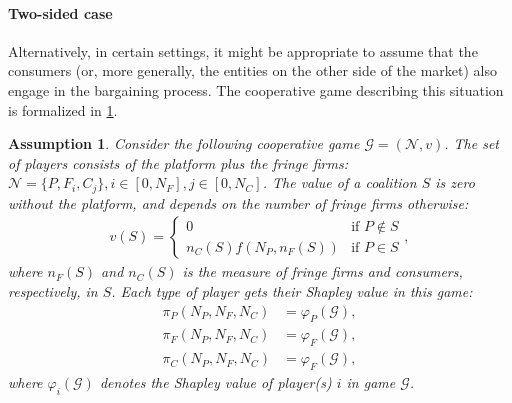 \documentclass[a4paper]{article}
\newtheorem{assumption}{Assumption}
\begin{document}
\paragraph{Two-sided case} Alternatively, in certain settings, it might be appropriate to assume that the consumers (or, more generally, the entities on the other side of the market) also engage in the bargaining process.
The cooperative game describing this situation is formalized in \cref{ass:profit_sharing_two_sided}.
\begin{assumption}
    \label{ass:profit_sharing_two_sided}
    Consider the following cooperative game $\mathcal{G} = (\mathcal{N}, v)$.
    The set of players consists of the platform plus the fringe firms: $\mathcal{N} = \{P, F_i, C_j\}, i \in [0, N_F], j \in [0, N_C]$.
    The value of a coalition $S$ is zero without the platform, and depends on the number of fringe firms otherwise:
    \begin{align*}
        v(S) = \begin{cases}
            0 & \text{if } P \notin S \\
            n_C(S) f(N_P, n_F(S)) & \text{if } P \in S
        \end{cases},
    \end{align*}
    where $n_F(S)$ and $n_C(S)$ is the measure of fringe firms and consumers, respectively, in $S$.
    Each type of player gets their Shapley value in this game:
    \begin{align*}
        \pi_P(N_P, N_F, N_C) &= \varphi_P(\mathcal{G}), \\
        \pi_F(N_P, N_F, N_C) &= \varphi_F(\mathcal{G}), \\
        \pi_C(N_P, N_F, N_C) &= \varphi_F(\mathcal{G}),
    \end{align*}
    where $\varphi_i(\mathcal{G})$ denotes the Shapley value of player(s) $i$ in game $\mathcal{G}$.
\end{assumption}
\end{document}
